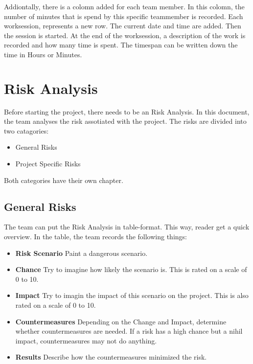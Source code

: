 \documentclass[10pt]{report}
\begin{document}
Addiontally, there is a colomn added for each team member. In this colomn, the number of minutes that is spend by this specific teammember is recorded. Each worksession, represents a new row. The current date and time are added. Then the session is started. At the end of the worksession, a description of the work is recorded and how many time is spent. The timespan can be written down the time in Hours or Minutes.

\newpage

\section{Risk Analysis}

Before starting the project, there needs to be an Risk Analysis. In this document, the team analyses the risk assotiated with the project. The risks are divided into two catagories:

\begin{itemize}
	\item General Risks
	\item Project Specific Risks
\end{itemize}

Both categories have their own chapter.

\subsection{General Risks}

The team can put the Risk Analysis in table-format. This way, reader get a quick overview. In the table, the team records the following things:

\begin{itemize}
	\item \textbf{Risk Scenario} Paint a dangerous scenario.
	\item \textbf{Chance} Try to imagine how likely the scenario is. This is rated on a scale of 0 to 10.
	\item \textbf{Impact} Try to imagin the impact of this scenario on the project. This is also rated on a scale of 0 to 10.  
	\item \textbf{Countermeasures} Depending on the Change and Impact, determine whether countermeasures are needed. If a risk has a high chance but a nihil impact, countermeasures may not do anything.
	\item \textbf{Results} Describe how the countermeasures minimized the risk.  
\end{itemize}
\end{document}
